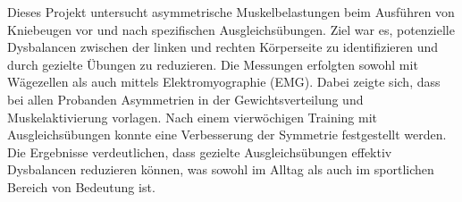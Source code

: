 Dieses Projekt untersucht asymmetrische Muskelbelastungen beim Ausführen von Kniebeugen vor und nach spezifischen Ausgleichsübungen. 
Ziel war es, potenzielle Dysbalancen zwischen der linken und rechten Körperseite zu identifizieren und durch gezielte Übungen zu reduzieren. 
Die Messungen erfolgten sowohl mit Wägezellen als auch mittels Elektromyographie (EMG). 
Dabei zeigte sich, dass bei allen Probanden Asymmetrien in der Gewichtsverteilung und Muskelaktivierung vorlagen. 
Nach einem vierwöchigen Training mit Ausgleichsübungen konnte eine Verbesserung der Symmetrie festgestellt werden. 
Die Ergebnisse verdeutlichen, dass gezielte Ausgleichsübungen effektiv Dysbalancen reduzieren können, was sowohl im Alltag als auch im sportlichen Bereich von Bedeutung ist.